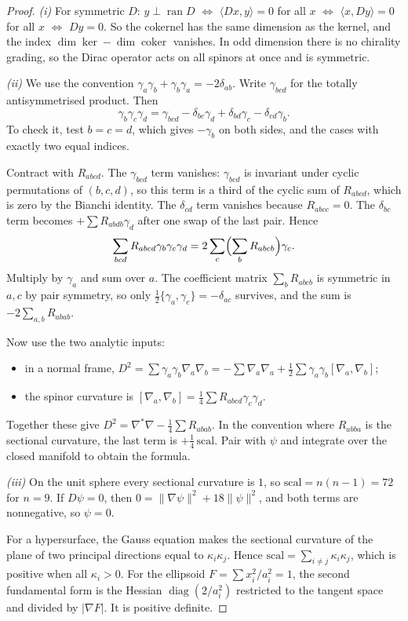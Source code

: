 \begin{proof}
\emph{(i)} For symmetric $D$: $y\perp\operatorname{ran}D$ $\iff$ $\langle Dx,y\rangle=0$ for all $x$ $\iff$ $\langle x,Dy\rangle=0$ for all $x$ $\iff$ $Dy=0$. So the cokernel has the same dimension as the kernel, and the index $\dim\ker-\dim\operatorname{coker}$ vanishes. In odd dimension there is no chirality grading, so the Dirac operator acts on all spinors at once and is symmetric.

\emph{(ii)} We use the convention $\gamma_a\gamma_b+\gamma_b\gamma_a=-2\delta_{ab}$. Write $\gamma_{bcd}$ for the totally antisymmetrised product. Then
\[
\gamma_b\gamma_c\gamma_d=\gamma_{bcd}-\delta_{bc}\gamma_d+\delta_{bd}\gamma_c-\delta_{cd}\gamma_b .
\]
To check it, test $b=c=d$, which gives $-\gamma_b$ on both sides, and the cases with exactly two equal indices.

Contract with $R_{abcd}$. The $\gamma_{bcd}$ term vanishes: $\gamma_{bcd}$ is invariant under cyclic permutations of $(b,c,d)$, so this term is a third of the cyclic sum of $R_{abcd}$, which is zero by the Bianchi identity. The $\delta_{cd}$ term vanishes because $R_{abcc}=0$. The $\delta_{bc}$ term becomes $+\sum R_{abdb}\gamma_d$ after one swap of the last pair. Hence
\[
\sum_{bcd}R_{abcd}\gamma_b\gamma_c\gamma_d=2\sum_c\Bigl(\sum_bR_{abcb}\Bigr)\gamma_c .
\]
Multiply by $\gamma_a$ and sum over $a$. The coefficient matrix $\sum_bR_{abcb}$ is symmetric in $a,c$ by pair symmetry, so only $\frac12\{\gamma_a,\gamma_c\}=-\delta_{ac}$ survives, and the sum is $-2\sum_{a,b}R_{abab}$.

Now use the two analytic inputs:
\begin{itemize}[nosep]
\item in a normal frame, $D^2=\sum\gamma_a\gamma_b\nabla_a\nabla_b=-\sum\nabla_a\nabla_a+\frac12\sum\gamma_a\gamma_b[\nabla_a,\nabla_b]$;
\item the spinor curvature is $[\nabla_a,\nabla_b]=\frac14\sum R_{abcd}\gamma_c\gamma_d$.
\end{itemize}
Together these give $D^2=\nabla^*\nabla-\frac14\sum R_{abab}$. In the convention where $R_{abba}$ is the sectional curvature, the last term is $+\frac14\,\mathrm{scal}$. Pair with $\psi$ and integrate over the closed manifold to obtain the formula.

\emph{(iii)} On the unit sphere every sectional curvature is $1$, so $\mathrm{scal}=n(n-1)=72$ for $n=9$. If $D\psi=0$, then $0=\|\nabla\psi\|^2+18\|\psi\|^2$, and both terms are nonnegative, so $\psi=0$.

For a hypersurface, the Gauss equation makes the sectional curvature of the plane of two principal directions equal to $\kappa_i\kappa_j$. Hence $\mathrm{scal}=\sum_{i\ne j}\kappa_i\kappa_j$, which is positive when all $\kappa_i>0$. For the ellipsoid $F=\sum x_i^2/a_i^2=1$, the second fundamental form is the Hessian $\operatorname{diag}(2/a_i^2)$ restricted to the tangent space and divided by $|\nabla F|$. It is positive definite.
\end{proof}


